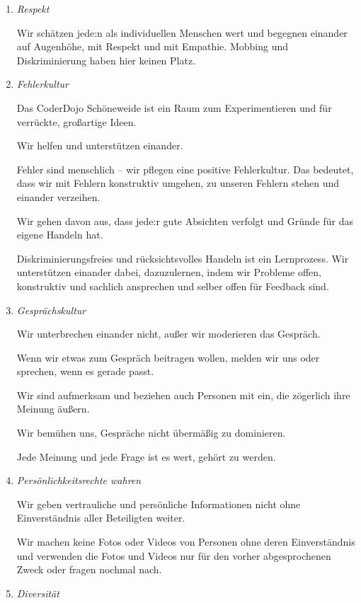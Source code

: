 \begin{enumerate}
    \item \textit{Respekt}

    Wir schätzen jede:n als individuellen Menschen wert und begegnen einander auf Augenhöhe, mit Respekt und mit Empathie.
    Mobbing und Diskriminierung haben hier keinen Platz.


    \item \textit{Fehlerkultur}

    Das CoderDojo Schöneweide ist ein Raum zum Experimentieren und für verrückte, großartige Ideen.

    Wir helfen und unterstützen einander.

    Fehler sind menschlich -- wir pflegen eine positive Fehlerkultur.
    Das bedeutet, dass wir mit Fehlern konstruktiv umgehen, zu unseren Fehlern stehen und einander verzeihen.

    Wir gehen davon aus, dass jede:r gute Absichten verfolgt und Gründe für das eigene Handeln hat.

    Diskriminierungsfreies und rücksichtsvolles Handeln ist ein Lernprozess.
    Wir unterstützen einander dabei, dazuzulernen, indem wir Probleme offen, konstruktiv und sachlich ansprechen und selber offen für Feedback sind.

    \item \textit{Gesprächskultur}

    Wir unterbrechen einander nicht, außer wir moderieren das Gespräch.

    Wenn wir etwas zum Gespräch beitragen wollen, melden wir uns oder sprechen, wenn es gerade passt.

    Wir sind aufmerksam und beziehen auch Personen mit ein, die zögerlich ihre Meinung äußern.

    Wir bemühen uns, Gespräche nicht übermäßig zu dominieren.

    Jede Meinung und jede Frage ist es wert, gehört zu werden.

    \item \textit{Persönlichkeitsrechte wahren}

    Wir geben vertrauliche und persönliche Informationen nicht ohne Einverständnis aller Beteiligten weiter.

    Wir machen keine Fotos oder Videos von Personen ohne deren Einverständnis und verwenden die Fotos und Videos nur für den vorher abgesprochenen Zweck oder fragen nochmal nach.

    \item \textit{Diversität}


\end{enumerate}
